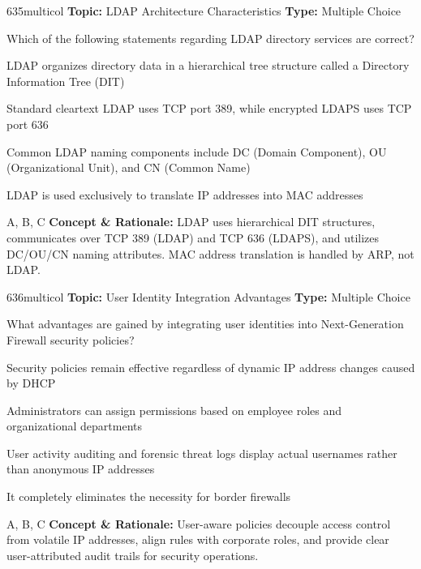 \begin{qcard}{635}{multicol}
\textcolor{darkslate!75}{\small\textbf{Topic:} LDAP Architecture Characteristics \hfill \textbf{Type:} Multiple Choice}\vspace{0.4em}\par
Which of the following statements regarding LDAP directory services are correct?
\begin{qoptions}
\item LDAP organizes directory data in a hierarchical tree structure called a Directory Information Tree (DIT)
\item Standard cleartext LDAP uses TCP port 389, while encrypted LDAPS uses TCP port 636
\item Common LDAP naming components include DC (Domain Component), OU (Organizational Unit), and CN (Common Name)
\item LDAP is used exclusively to translate IP addresses into MAC addresses
\end{qoptions}
\end{qcard}
\nopagebreak
\begin{explainbox}{A, B, C}
\textbf{Concept \& Rationale:} LDAP uses hierarchical DIT structures, communicates over TCP 389 (LDAP) and TCP 636 (LDAPS), and utilizes DC/OU/CN naming attributes. MAC address translation is handled by ARP, not LDAP.
\end{explainbox}

\begin{qcard}{636}{multicol}
\textcolor{darkslate!75}{\small\textbf{Topic:} User Identity Integration Advantages \hfill \textbf{Type:} Multiple Choice}\vspace{0.4em}\par
What advantages are gained by integrating user identities into Next-Generation Firewall security policies?
\begin{qoptions}
\item Security policies remain effective regardless of dynamic IP address changes caused by DHCP
\item Administrators can assign permissions based on employee roles and organizational departments
\item User activity auditing and forensic threat logs display actual usernames rather than anonymous IP addresses
\item It completely eliminates the necessity for border firewalls
\end{qoptions}
\end{qcard}
\nopagebreak
\begin{explainbox}{A, B, C}
\textbf{Concept \& Rationale:} User-aware policies decouple access control from volatile IP addresses, align rules with corporate roles, and provide clear user-attributed audit trails for security operations.
\end{explainbox}

